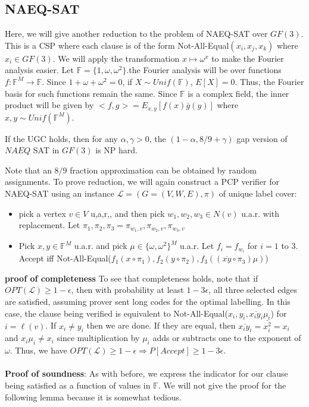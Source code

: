 \documentclass{article}
\newcommand{\1}{\mathbbm{1}}
\newcommand{\om}{\omega}
\newcommand{\F}{\mathbb{F}}
\begin{document}
\subsection*{NAEQ-SAT}
Here, we will give another reduction to the problem of NAEQ-SAT over $GF(3)$. This is a CSP where each clause is of the form Not-All-Equal$(x_i, x_j, x_k)$ where $x_i \in GF(3)$. We will apply the transformation $x\mapsto \omega^x$ to make the Fourier analysis easier. Let $\F = \{1,\om,\om^2\}$.the Fourier analysis will be over functions $f:\F^M\rightarrow \F$. Since $1+\om+\om^2 = 0$, if $X\sim Unif(\F)$, $E[X] = 0$. Thus, the Fourier basis for such functions remain the same. Since $\F$ is a complex field, the inner product will be given by $<f,g> = E_{x,y}[f(x)\bar{g}(y)]$ where $x,y\sim Unif(\F^M)$. 
\begin{theorem}
If the UGC holds, then for any $\alpha, \gamma > 0$, the $(1-\alpha, 8/9+\gamma)$ gap version of $NAEQ$ SAT in $GF(3)$ is NP hard.
\end{theorem}
Note that an $8/9$ fraction approximation can be obtained by random assignments. To prove reduction, we will again construct a PCP verifier for NAEQ-SAT using an instance $\mathcal{L} = (G=(V,W,E), \pi)$ of unique label cover:
\begin{itemize}
    \item pick a vertex $v\in V$ u,a,r,, and then pick $w_1, w_2, w_3\in N(v)$ u.a.r. with replacement. Let $\pi_1,\pi_2,\pi_3 = \pi_{w_1, v}, \pi_{w_2,v}, \pi_{w_3,v}$
    \item Pick $x,y \in \F^M$ u.a.r. and pick $\mu \in \{\om, \om^2\}^M$ u.a.r. Let $f_i = f_{w_i}$ for $i=1$ to $3$. Accept iff Not-All-Equal($f_1(x\circ \pi_1), f_2(y\circ\pi_2), f_3((\overline{xy}\circ \pi_3)\mu)$)
\end{itemize} 
\textbf{proof of completeness} To see that completeness holds, note that if $OPT(\mathcal{L})\geq 1-\epsilon$, then with probability at least $1-3\epsilon$, all three selected edges are satisfied, assuming prover sent long codes for the optimal labelling. In this case, the clause being verified is equivalent to Not-All-Equal($x_i, y_i, \overline{x_iy_i}\mu_{i}$) for $i = \ell(v)$. If $x_i\neq y_i$ then we are done. If they are equal, then $\overline{x_iy_i} = \bar{x_i^2} = x_i$ and $x_i\mu_i\neq x_i$ since multiplication by $\mu_i$ adds or subtracts one to the exponent of $\om$. Thus, we have $OPT(\mathcal{L}) \geq 1-\epsilon \Rightarrow P[Accept] \geq 1-3\epsilon$.\\\\
\textbf{Proof of soundness}: As with before, we express the indicator for our clause being satisfied as a function of values in $\F$. We will not give the proof for the following lemma because it is somewhat tedious.
\end{document}
